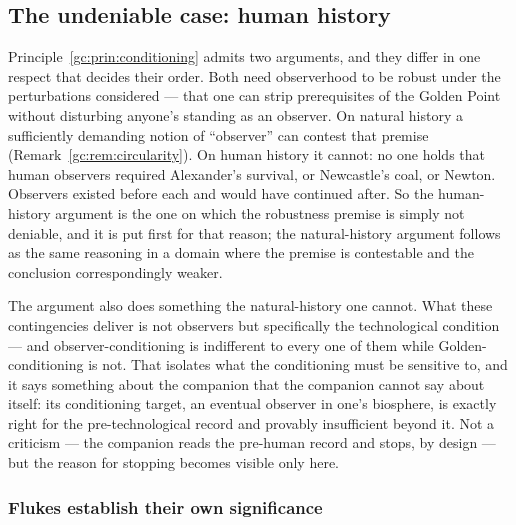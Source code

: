 \documentclass[11pt]{article}
\numberwithin{equation}{section}
\theoremstyle{plain}
\theoremstyle{definition}
\theoremstyle{remark}
\begin{document}
\subsection{The undeniable case: human history}\label{gc:sub:humanhistory}

Principle~\ref{gc:prin:conditioning} admits two arguments, and they
differ in one respect that decides their order. Both need observerhood
to be robust under the perturbations considered --- that one can strip
prerequisites of the Golden Point without disturbing anyone's standing
as an observer. On natural history a sufficiently demanding notion of
``observer'' can contest that premise (Remark~\ref{gc:rem:circularity}).
On human history it cannot: no one holds that human observers required
Alexander's survival, or Newcastle's coal, or Newton. Observers existed
before each and would have continued after. So the human-history
argument is the one on which the robustness premise is simply not
deniable, and it is put first for that reason; the natural-history
argument follows as the same reasoning in a domain where the premise is
contestable and the conclusion correspondingly weaker.

The argument also does something the natural-history one cannot. What
these contingencies deliver is not observers but specifically the
technological condition --- and observer-conditioning is indifferent to
every one of them while Golden-conditioning is not. That isolates what
the conditioning must be sensitive to, and it says something about the
companion that the companion cannot say about itself: its
conditioning target, an eventual observer in one's biosphere, is exactly
right for the pre-technological record and provably insufficient beyond
it. Not a criticism --- the companion reads the pre-human record and
stops, by design --- but the reason for stopping becomes visible only
here.

\subsubsection{Flukes establish their own significance}
\label{gc:subsub:flukes}
\end{document}
